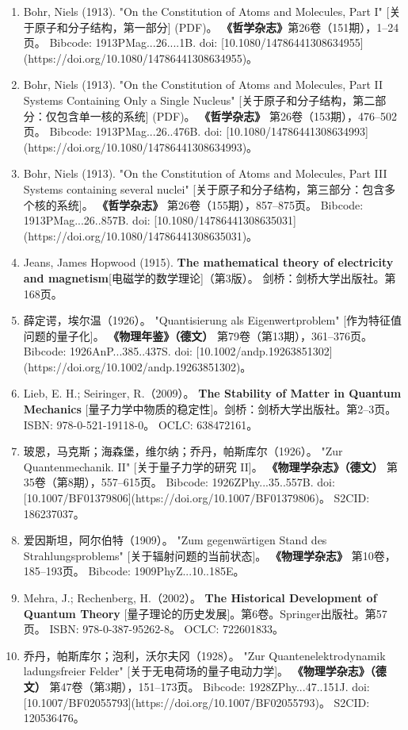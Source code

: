 \begin{enumerate}
\item Bohr, Niels (1913). 
  "On the Constitution of Atoms and Molecules, Part I" [关于原子和分子结构，第一部分] (PDF)。  
  \textbf{《哲学杂志》}第26卷（151期），1–24页。  
  Bibcode: 1913PMag...26....1B.  
  doi: [10.1080/14786441308634955](https://doi.org/10.1080/14786441308634955)。  
\item Bohr, Niels (1913).  
  "On the Constitution of Atoms and Molecules, Part II Systems Containing Only a Single Nucleus" [关于原子和分子结构，第二部分：仅包含单一核的系统] (PDF)。  
  \textbf{《哲学杂志》} 第26卷（153期），476–502页。  
  Bibcode: 1913PMag...26..476B.  
  doi: [10.1080/14786441308634993](https://doi.org/10.1080/14786441308634993)。  
\item Bohr, Niels (1913).  
  "On the Constitution of Atoms and Molecules, Part III Systems containing several nuclei" [关于原子和分子结构，第三部分：包含多个核的系统]。  
  \textbf{《哲学杂志》} 第26卷（155期），857–875页。  
  Bibcode: 1913PMag...26..857B.  
  doi: [10.1080/14786441308635031](https://doi.org/10.1080/14786441308635031)。  
\item Jeans, James Hopwood (1915). 
  \textbf{The mathematical theory of electricity and magnetism}[电磁学的数学理论]（第3版）。  
  剑桥：剑桥大学出版社。第168页。  
\item 薛定谔，埃尔温（1926）。 
  "Quantisierung als Eigenwertproblem" [作为特征值问题的量子化]。  
  \textbf{《物理年鉴》（德文）} 第79卷（第13期），361–376页。  
  Bibcode: 1926AnP...385..437S.  
  doi: [10.1002/andp.19263851302](https://doi.org/10.1002/andp.19263851302)。  
\item Lieb, E. H.; Seiringer, R.（2009）。  
  \textbf{The Stability of Matter in Quantum Mechanics} [量子力学中物质的稳定性]。剑桥：剑桥大学出版社。第2–3页。  
  ISBN: 978-0-521-19118-0。  
  OCLC: 638472161。  
\item 玻恩，马克斯；海森堡，维尔纳；乔丹，帕斯库尔（1926）。  
  "Zur Quantenmechanik. II" [关于量子力学的研究 II]。  
  \textbf{《物理学杂志》（德文）} 第35卷（第8期），557–615页。  
  Bibcode: 1926ZPhy...35..557B.  
  doi: [10.1007/BF01379806](https://doi.org/10.1007/BF01379806)。  
  S2CID: 186237037。  
\item 爱因斯坦，阿尔伯特（1909）。 
  "Zum gegenwärtigen Stand des Strahlungsproblems" [关于辐射问题的当前状态]。  
  \textbf{《物理学杂志》} 第10卷，185–193页。  
  Bibcode: 1909PhyZ...10..185E。  
\item Mehra, J.; Rechenberg, H.（2002）。  
  \textbf{The Historical Development of Quantum Theory} [量子理论的历史发展]。第6卷。Springer出版社。第57页。  
  ISBN: 978-0-387-95262-8。  
  OCLC: 722601833。  
\item 乔丹，帕斯库尔；泡利，沃尔夫冈（1928）。 
  "Zur Quantenelektrodynamik ladungsfreier Felder" [关于无电荷场的量子电动力学]。  
  \textbf{《物理学杂志》（德文）} 第47卷（第3期），151–173页。  
  Bibcode: 1928ZPhy...47..151J.  
  doi: [10.1007/BF02055793](https://doi.org/10.1007/BF02055793)。  
  S2CID: 120536476。  


\end{enumerate}
